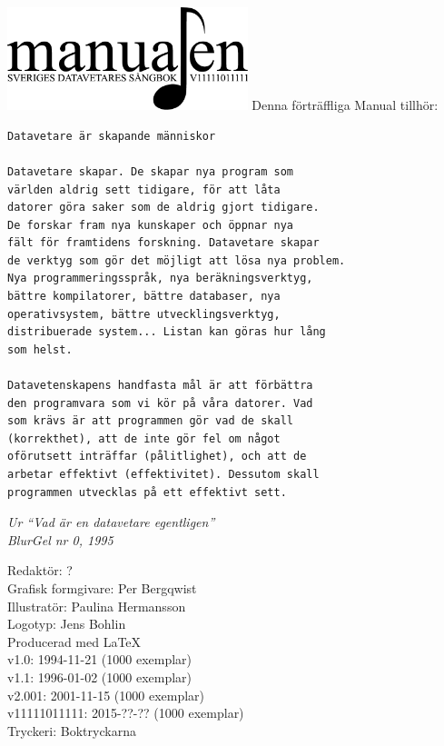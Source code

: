 \documentclass[a6paper,fontsize=10pt,twoside,open=right]{scrbook}
\begin{document}
\setlength{\parindent}{0pt}
\vspace*{6.5cm}
\hspace*{0.9cm}
\includegraphics[keepaspectratio,width=7cm]{elements/logo.pdf}
\clearpage
\noindent Denna förträffliga Manual tillhör:
\ohead{\textnormal{\textsc{\scriptsize\leftmark}}}
\ofoot[\pagemark]{\textsc{\scriptsize\pagemark}}
\clearpage
{\small\begin{verbatim}
Datavetare är skapande människor

Datavetare skapar. De skapar nya program som
världen aldrig sett tidigare, för att låta
datorer göra saker som de aldrig gjort tidigare.
De forskar fram nya kunskaper och öppnar nya
fält för framtidens forskning. Datavetare skapar
de verktyg som gör det möjligt att lösa nya problem.
Nya programmeringsspråk, nya beräkningsverktyg,
bättre kompilatorer, bättre databaser, nya
operativsystem, bättre utvecklingsverktyg,
distribuerade system... Listan kan göras hur lång
som helst.
  
Datavetenskapens handfasta mål är att förbättra
den programvara som vi kör på våra datorer. Vad
som krävs är att programmen gör vad de skall
(korrekthet), att de inte gör fel om något
oförutsett inträffar (pålitlighet), och att de
arbetar effektivt (effektivitet). Dessutom skall
programmen utvecklas på ett effektivt sett.
\end{verbatim}}
\vspace{10pt}
{\footnotesize\textit{Ur ``Vad är en datavetare
egentligen''\\ BlurGel nr 0, 1995}}
\clearpage
\setlength{\parindent}{15pt}
\null
\vfill
    {\noindent\small\centering
      Redaktör: ?\\
      Grafisk formgivare: Per Bergqwist\\
      Illustratör: Paulina Hermansson\\
      Logotyp: Jens Bohlin\\
      Producerad med \LaTeX\\
      v1.0: 1994-11-21 (1000 exemplar)\\
      v1.1: 1996-01-02 (1000 exemplar)\\
      v2.001: 2001-11-15 (1000 exemplar)\\
      v11111011111: 2015-??-?? (1000 exemplar)\\
      Tryckeri: Boktryckarna\par
    }
\cleardoublepage
\end{document}
